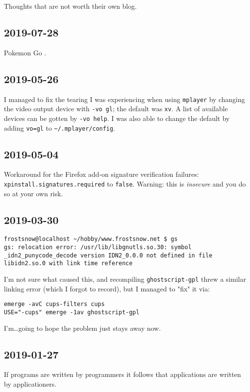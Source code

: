 \documentclass{article}
\begin{document}
Thoughts that are not worth their own blog.

\subsection{2019-07-28}
Pokemon Go .

\subsection{2019-05-26}
I managed to fix the tearing I was experiencing when using \texttt{mplayer} by changing the video output device with \texttt{-vo gl}; the default was \texttt{xv}.  A list of available devices can be gotten by \texttt{-vo help}.  I was also able to change the default by adding \texttt{vo=gl} to \verb|~/.mplayer/config|.

\subsection{2019-05-04}
Workaround for the Firefox add-on signature verification failures: \texttt{xpinstall.signatures.required} to \texttt{false}.  Warning: this is \emph{insecure} and you do so at your own risk.

\subsection{2019-03-30}
\begin{verbatim}
frostsnow@localhost ~/hobby/www.frostsnow.net $ gs
gs: relocation error: /usr/lib/libgnutls.so.30: symbol _idn2_punycode_decode version IDN2_0.0.0 not defined in file libidn2.so.0 with link time reference
\end{verbatim}
I'm not sure what caused this, and recompiling \texttt{ghostscript-gpl} threw a similar linking error (which I forgot to record), but I managed to "fix" it via:
\begin{verbatim}
emerge -avC cups-filters cups
USE="-cups" emerge -1av ghostscript-gpl
\end{verbatim}
I'm\ldots going to hope the problem just stays away now.

\subsection{2019-01-27}
If programs are written by programmers it follows that applications are written by applicationers.
\end{document}
